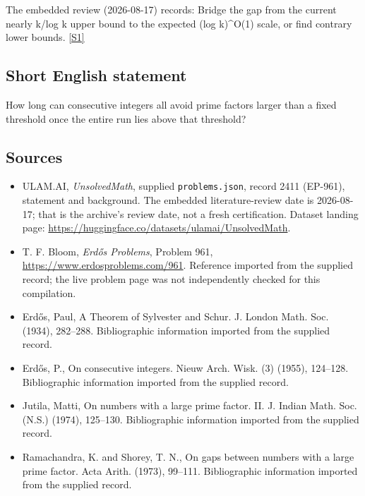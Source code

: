 \documentclass[11pt,a4paper]{article}
\newcommand{\sref}[2]{\hyperlink{source:#1:#2}{[S#2]}}
\begin{document}
The embedded review (2026-08-17) records: Bridge the gap from the current nearly k/log k upper bound to the expected (log k)\textasciicircum{}O(1) scale, or find contrary lower bounds. \sref{2411}{1}

\subsection{Short English statement}

How long can consecutive integers all avoid prime factors larger than a fixed threshold once the entire run lies above that threshold?

\subsection{Sources}

{\small

\begin{itemize}

\item[\hypertarget{source:2411:1}{S1}] ULAM.AI, \emph{UnsolvedMath}, supplied \texttt{problems.json}, record 2411 (EP-961), statement and background. The embedded literature-review date is 2026-08-17; that is the archive’s review date, not a fresh certification. Dataset landing page: \url{https://huggingface.co/datasets/ulamai/UnsolvedMath}.

\item[\hypertarget{source:2411:2}{S2}] T. F. Bloom, \emph{Erdős Problems}, Problem 961, \url{https://www.erdosproblems.com/961}. Reference imported from the supplied record; the live problem page was not independently checked for this compilation.

\item[\hypertarget{source:2411:3}{S3}] Erd\H{o}s, Paul, A {T}heorem of {S}ylvester and {S}chur. J. London Math. Soc. (1934), 282--288. Bibliographic information imported from the supplied record.

\item[\hypertarget{source:2411:4}{S4}] Erd\H{o}s, P., On consecutive integers. Nieuw Arch. Wisk. (3) (1955), 124--128. Bibliographic information imported from the supplied record.

\item[\hypertarget{source:2411:5}{S5}] Jutila, Matti, On numbers with a large prime factor. {II}. J. Indian Math. Soc. (N.S.) (1974), 125--130. Bibliographic information imported from the supplied record.

\item[\hypertarget{source:2411:6}{S6}] Ramachandra, K. and Shorey, T. N., On gaps between numbers with a large prime factor. Acta Arith. (1973), 99--111. Bibliographic information imported from the supplied record.

\end{itemize}

}

\label{end:2411}
\end{document}
